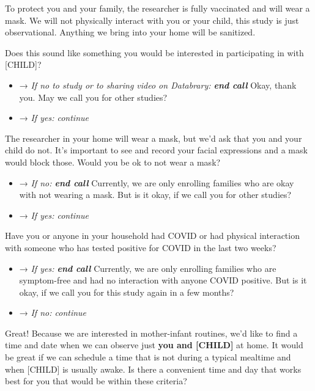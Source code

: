 \documentclass[
]{book}
\providecommand{\tightlist}{%
  \setlength{\itemsep}{0pt}\setlength{\parskip}{0pt}}
\begin{document}
To protect you and your family, the researcher is fully vaccinated and will wear a mask. We will not physically interact with you or your child, this study is just observational. Anything we bring into your home will be sanitized.

Does this sound like something you would be interested in participating in with {[}CHILD{]}?

\begin{itemize}
\tightlist
\item
  → \emph{If no to study or to sharing video on Databrary: \textbf{end call} } Okay, thank you. May we call you for other studies?
\item
  → \emph{If yes: continue}
\end{itemize}

The researcher in your home will wear a mask, but we'd ask that you and your child do not. It's important to see and record your facial expressions and a mask would block those. Would you be ok to not wear a mask?

\begin{itemize}
\tightlist
\item
  → \emph{If no: \textbf{end call} } Currently, we are only enrolling families who are okay with not wearing a mask. But is it okay, if we call you for other studies?
\item
  → \emph{If yes: continue}
\end{itemize}

Have you or anyone in your household had COVID or had physical interaction with someone who has tested positive for COVID in the last two weeks?

\begin{itemize}
\tightlist
\item
  → \emph{If yes: \textbf{end call} } Currently, we are only enrolling families who are symptom-free and had no interaction with anyone COVID positive. But is it okay, if we call you for this study again in a few months?
\item
  → \emph{If no: continue}
\end{itemize}

Great! Because we are interested in mother-infant routines, we'd like to find a time and date when we can observe just {\textbf{you and {[}CHILD{]}}} at home. It would be great if we can schedule a time that is not during a typical mealtime and when {[}CHILD{]} is usually awake. Is there a convenient time and day that works best for you that would be within these criteria?
\end{document}
